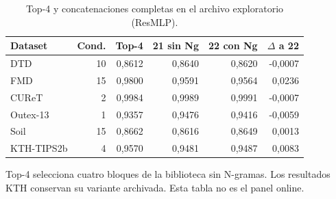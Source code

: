 \begin{table}[!htbp]\centering
\fontsize{9}{11}\selectfont\setlength{\tabcolsep}{4pt}
\caption{Top-4 y concatenaciones completas en el archivo exploratorio (ResMLP).}\label{tab:tm-top4-resmlp}
\begin{tabular}{@{}lrrrrr@{}}\toprule
Dataset & Cond. & Top-4 & 21 sin Ng & 22 con Ng & $\Delta$ a 22\\\midrule
DTD & 10 & 0,8612 & 0,8640 & 0,8620 & -0,0007\\
FMD & 15 & 0,9800 & 0,9591 & 0,9564 & 0,0236\\
CUReT & 2 & 0,9984 & 0,9989 & 0,9991 & -0,0007\\
Outex-13 & 1 & 0,9357 & 0,9476 & 0,9416 & -0,0059\\
Soil & 15 & 0,8662 & 0,8616 & 0,8649 & 0,0013\\
KTH-TIPS2b & 4 & 0,9570 & 0,9481 & 0,9487 & 0,0083\\
\bottomrule\end{tabular}
\par\smallskip\begin{minipage}{0.98\textwidth}\footnotesize Top-4 selecciona cuatro bloques de la biblioteca sin N-gramas. Los resultados KTH conservan su variante archivada. Esta tabla no es el panel online.\end{minipage}
\end{table}

